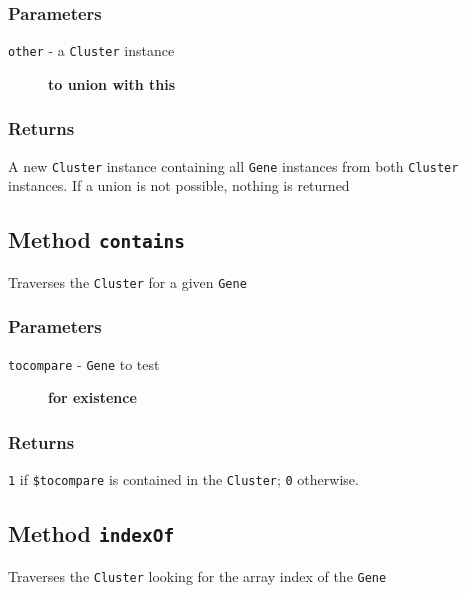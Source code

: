 \subsubsection*{Parameters\label{Parameters}}
\begin{description}

\item[{\texttt{other} - a \texttt{Cluster} instance}] \textbf{to union with this}\end{description}
\subsubsection*{Returns\label{Returns}}


A new \texttt{Cluster} instance containing all \texttt{Gene} instances from both \texttt{Cluster} instances. If 
a union is not possible, nothing is returned

\subsection*{Method \texttt{contains}\label{Method_contains}}


Traverses the \texttt{Cluster} for a given \texttt{Gene}

\subsubsection*{Parameters\label{Parameters}}
\begin{description}

\item[{\texttt{tocompare} - \texttt{Gene} to test}] \textbf{for existence}\end{description}
\subsubsection*{Returns\label{Returns}}


\texttt{1} if \texttt{\$tocompare} is contained in the \texttt{Cluster}; \texttt{0} otherwise.

\subsection*{Method \texttt{indexOf}\label{Method_indexOf}}


Traverses the \texttt{Cluster} looking for the array index of the \texttt{Gene}

